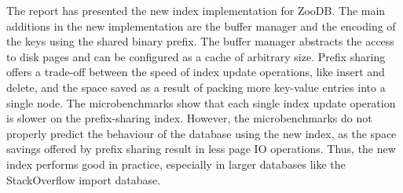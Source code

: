 \documentclass[11pt,a4paper,oneside]{article}
\begin{document}
The report has presented the new index implementation for ZooDB. The main additions in the new implementation are the buffer manager and the encoding of the keys using the shared binary prefix. The buffer manager abstracts the access to disk pages and can be configured as a cache of arbitrary size. Prefix sharing offers a trade-off between the speed of index update operations, like insert and delete, and the space saved as a result of packing more key-value entries into a single node. The microbenchmarks show that each single index update operation is slower on the prefix-sharing index. However, the microbenchmarks do not properly predict the behaviour of the database using the new index, as the space savings offered by prefix sharing result in less page IO operations. Thus, the new index performs good in practice, especially in larger databases like the StackOverflow import database.
\end{document}
